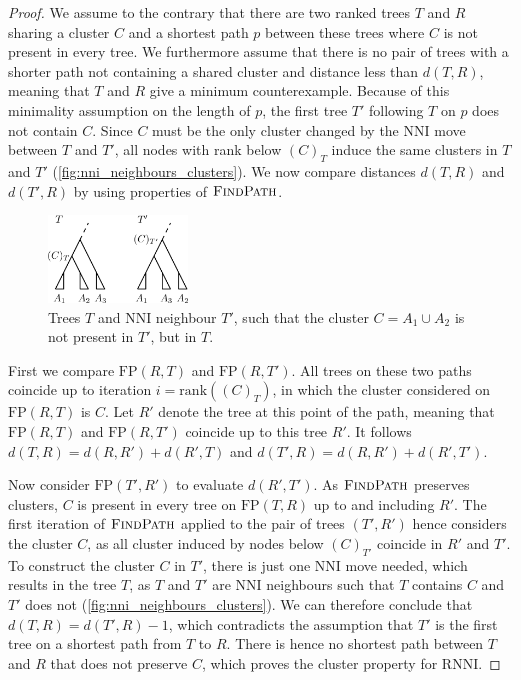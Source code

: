 \documentclass[11pt]{amsart}
\newcommand{\rnni}{\mathrm{RNNI}}
\newcommand{\findpath}{\textsc{FindPath}}
\newcommand{\rank}{\mathrm{rank}}
\newcommand{\nni}{\mathrm{NNI}}
\newcommand{\fp}{\mathrm{FP}}
\begin{document}
\begin{proof}
	We assume to the contrary that there are two ranked trees $T$ and $R$ sharing a cluster $C$ and a shortest path $p$ between these trees where $C$ is not present in every tree.
	We furthermore assume that there is no pair of trees with a shorter path not containing a shared cluster and distance less than $d(T,R)$, meaning that $T$ and $R$ give a minimum counterexample.
	Because of this minimality assumption on the length of $p$, the first tree $T'$ following $T$ on $p$ does not contain $C$.
	Since $C$ must be the only cluster changed by the $\nni$ move between $T$ and $T'$, all nodes with rank below $(C)_T$ induce the same clusters in $T$ and $T'$ (\autoref{fig:nni_neighbours_clusters}).
	We now compare distances $d(T,R)$ and $d(T',R)$ by using properties of $\findpath$.

	\begin{figure}[ht]
		\includegraphics[width=0.33\textwidth]{nni_neighbours_clusters.eps}
		\caption{Trees $T$ and $\nni$ neighbour $T'$, such that the cluster $C = A_1 \cup A_2$ is not present in $T'$, but in $T$.}
		\label{fig:nni_neighbours_clusters}
	\end{figure}

	First we compare $\fp(R,T)$ and $\fp(R,T')$.
	All trees on these two paths coincide up to iteration $i = \rank((C)_T)$, in which the cluster considered on $\fp(R,T)$ is $C$.
	Let $R'$ denote the tree at this point of the path, meaning that $\fp(R,T)$ and $\fp(R,T')$ coincide up to this tree $R'$.
	It follows $d(T,R) = d(R,R') + d(R', T)$ and $d(T',R) = d(R,R') + d(R', T')$.

	Now consider $\fp(T', R')$ to evaluate $d(R', T')$.
	As $\findpath$ preserves clusters, $C$ is present in every tree on $\fp(T,R)$ up to and including $R'$.
	The first iteration of $\findpath$ applied to the pair of trees $(T',R')$ hence considers the cluster $C$, as all cluster induced by nodes below $(C)_{T'}$ coincide in $R'$ and $T'$.
	To construct the cluster $C$ in $T'$, there is just one $\nni$ move needed, which results in the tree $T$, as $T$ and $T'$ are $\nni$ neighbours such that $T$ contains $C$ and $T'$ does not (\autoref{fig:nni_neighbours_clusters}).
	We can therefore conclude that $d(T,R) = d(T',R) - 1$, which contradicts the assumption that $T'$ is the first tree on a shortest path from $T$ to $R$.
	There is hence no shortest path between $T$ and $R$ that does not preserve $C$, which proves the cluster property for $\rnni$.
\end{proof}
\end{document}
